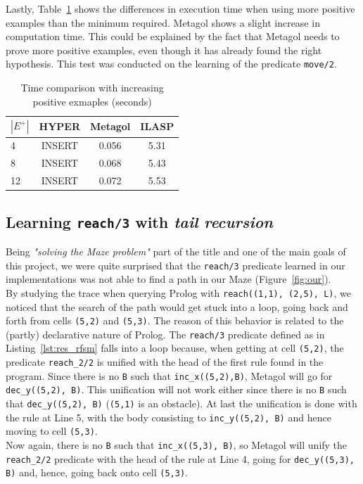 Lastly, Table~\ref{tab:ex_cmp} shows the differences in execution time when using more positive examples than the minimum required. Metagol shows a slight 
increase in computation time. This could be explained by the fact that Metagol needs to prove more positive examples, even though it has already
found the right hypothesis. This test was conducted on the learning of the predicate \texttt{move/2}.

{
\begin{center}
    \begin{table}[h]
    \centering
    \begin{tabular}{ |l|c|c|c| } 
        \hline
        \(|E^+|\) & \textbf{HYPER} & \textbf{Metagol} & \textbf{ILASP} \\ \hline
        4 & INSERT & 0.056 & 5.31 \\ 
        8 & INSERT & 0.068 & 5.43 \\
        12 & INSERT & 0.072 & 5.53 \\  
        \hline
    \end{tabular}
    \caption{\label{tab:ex_cmp}Time comparison with increasing positive exmaples (seconds)}
\end{table}
\end{center}
}

\subsection{Learning \texttt{reach/3} with \emph{tail recursion}}
Being \emph{"solving the Maze problem"} part of the title and one of the main goals of this project, we were
quite surprised that the \texttt{reach/3} predicate learned in our implementations was not able to find a path
in our Maze (Figure~\ref{fig:our}).\\
By studying the trace when querying Prolog with \texttt{reach((1,1), (2,5), L)},
we noticed that the search of the path would get stuck into a loop, going back and forth from cells \texttt{(5,2)} and
\texttt{(5,3)}. The reason of this behavior is related to the (partly) declarative nature of Prolog. The \texttt{reach/3}
predicate defined as in Listing~\ref{lst:res_rfsm} falls into a loop because, when getting at cell \texttt{(5,2)},
the predicate \texttt{reach\_2/2} is unified with the head of the first rule found in the program. Since there is
no \texttt{B} such that \texttt{inc\_x((5,2),B)}, Metagol will go for \texttt{dec\_y((5,2), B)}. This unification
will not work either since there is no \texttt{B} such that \texttt{dec\_y((5,2), B)} (\texttt{(5,1)} is an obstacle). At
last the unification is done with the rule at Line 5, with the body consisting to \texttt{inc\_y((5,2), B)} and hence moving
to cell \texttt{(5,3)}.\\
Now again, there is no \texttt{B} such that \texttt{inc\_x((5,3), B)}, so Metagol will unify the
\texttt{reach\_2/2} predicate with the head of the rule at Line 4, going for \texttt{dec\_y((5,3), B)} and, hence,
going back onto cell \texttt{(5,3)}.\\

